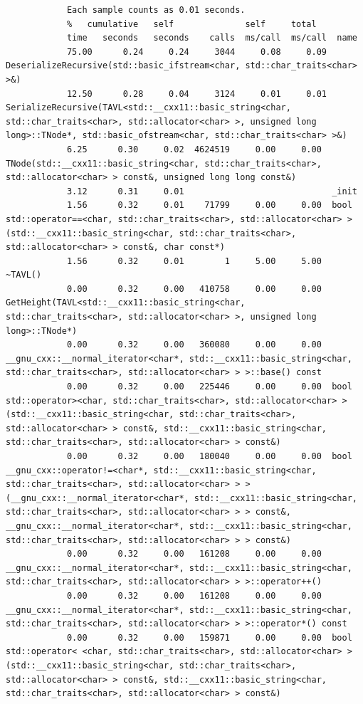 \documentclass[12pt]{article}
\begin{document}
\begin{small}
\begin{verbatim}
			Each sample counts as 0.01 seconds.
			%   cumulative   self              self     total           
			time   seconds   seconds    calls  ms/call  ms/call  name    
			75.00      0.24     0.24     3044     0.08     0.09  DeserializeRecursive(std::basic_ifstream<char, std::char_traits<char> >&)
			12.50      0.28     0.04     3124     0.01     0.01  SerializeRecursive(TAVL<std::__cxx11::basic_string<char, std::char_traits<char>, std::allocator<char> >, unsigned long long>::TNode*, std::basic_ofstream<char, std::char_traits<char> >&)
			6.25      0.30     0.02  4624519     0.00     0.00  TNode(std::__cxx11::basic_string<char, std::char_traits<char>, std::allocator<char> > const&, unsigned long long const&)
			3.12      0.31     0.01                             _init
			1.56      0.32     0.01    71799     0.00     0.00  bool std::operator==<char, std::char_traits<char>, std::allocator<char> >(std::__cxx11::basic_string<char, std::char_traits<char>, std::allocator<char> > const&, char const*)
			1.56      0.32     0.01        1     5.00     5.00  ~TAVL()
			0.00      0.32     0.00   410758     0.00     0.00  GetHeight(TAVL<std::__cxx11::basic_string<char, std::char_traits<char>, std::allocator<char> >, unsigned long long>::TNode*)
			0.00      0.32     0.00   360080     0.00     0.00  __gnu_cxx::__normal_iterator<char*, std::__cxx11::basic_string<char, std::char_traits<char>, std::allocator<char> > >::base() const
			0.00      0.32     0.00   225446     0.00     0.00  bool std::operator><char, std::char_traits<char>, std::allocator<char> >(std::__cxx11::basic_string<char, std::char_traits<char>, std::allocator<char> > const&, std::__cxx11::basic_string<char, std::char_traits<char>, std::allocator<char> > const&)
			0.00      0.32     0.00   180040     0.00     0.00  bool __gnu_cxx::operator!=<char*, std::__cxx11::basic_string<char, std::char_traits<char>, std::allocator<char> > >(__gnu_cxx::__normal_iterator<char*, std::__cxx11::basic_string<char, std::char_traits<char>, std::allocator<char> > > const&, __gnu_cxx::__normal_iterator<char*, std::__cxx11::basic_string<char, std::char_traits<char>, std::allocator<char> > > const&)
			0.00      0.32     0.00   161208     0.00     0.00  __gnu_cxx::__normal_iterator<char*, std::__cxx11::basic_string<char, std::char_traits<char>, std::allocator<char> > >::operator++()
			0.00      0.32     0.00   161208     0.00     0.00  __gnu_cxx::__normal_iterator<char*, std::__cxx11::basic_string<char, std::char_traits<char>, std::allocator<char> > >::operator*() const
			0.00      0.32     0.00   159871     0.00     0.00  bool std::operator< <char, std::char_traits<char>, std::allocator<char> >(std::__cxx11::basic_string<char, std::char_traits<char>, std::allocator<char> > const&, std::__cxx11::basic_string<char, std::char_traits<char>, std::allocator<char> > const&)

\end{verbatim}
\end{small}
\end{document}
